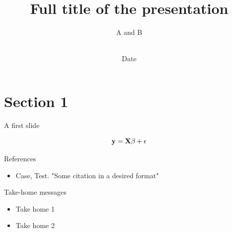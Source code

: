 \documentclass{beamer}
\title[Footer Caption \hspace{3mm} Short title \hspace{9em} \insertframenumber\ of \inserttotalframenumber]
{Full title of the presentation}
\author[Author A, Author B]
{A and B \\ \vspace{3mm} \\}
\date{Date}
\institute[The University of Iowa]
{The University of Iowa, College of (Fill in)}
\begin{document}
\frame{\titlepage}


\section{Section 1}

\begin{frame}{A first slide}

$$\mathbf{y} = \mathbf{X}\beta + \epsilon$$

\end{frame}

\begin{frame}{References}
    \begin{itemize}
        \item Case, Test. "Some citation in a desired format" 
    \end{itemize}
\end{frame}
\begin{frame}{Take-home messages}
    \begin{itemize}
        
        \item Take home 1
        
        \item Take home 2 
    \end{itemize}
    
\end{frame}    

\end{document}

